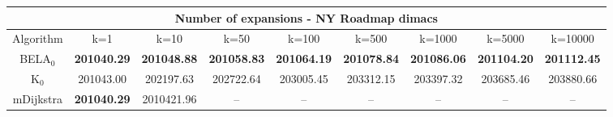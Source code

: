\begin{tabular}{c|cccccccc}\toprule
\multicolumn{9}{c}{Number of expansions - NY Roadmap dimacs}\\ \midrule
Algorithm & k=1 & k=10 & k=50 & k=100 & k=500 & k=1000 & k=5000 & k=10000 \\ \midrule
BELA$_0$ & \textbf{201040.29} & \textbf{201048.88} & \textbf{201058.83} & \textbf{201064.19} & \textbf{201078.84} & \textbf{201086.06} & \textbf{201104.20} & \textbf{201112.45} \\
K$_0$ & 201043.00 & 202197.63 & 202722.64 & 203005.45 & 203312.15 & 203397.32 & 203685.46 & 203880.66 \\
mDijkstra & \textbf{201040.29} & 2010421.96 & -- & -- & -- & -- & -- & -- \\ \bottomrule 
\end{tabular}

